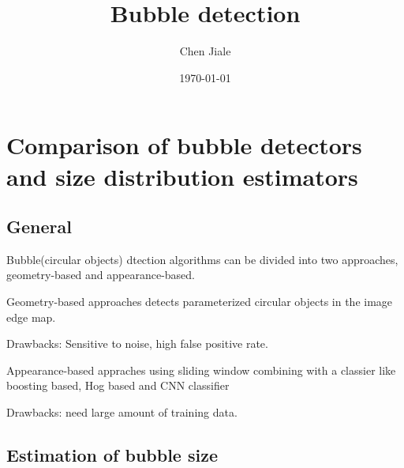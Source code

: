 \documentclass[11pt]{elegantpaper}
\title{Bubble detection}
\author{Chen Jiale}
\date{\today}
\begin{document}
\maketitle

\begin{abstract}

\end{abstract}

\setlength{\parindent}{2em}
\section{Comparison of bubble detectors and size distribution estimators}
\subsection*{General}    
Bubble(circular objects) dtection algorithms can be divided into two approaches, geometry-based and appearance-based.

Geometry-based approaches detects parameterized circular objects in the image edge map.

Drawbacks: Sensitive to noise, high false positive rate. 

Appearance-based appraches using sliding window combining with a classier like boosting based, 
Hog based and CNN classifier

Drawbacks: need large amount of training data.

\subsection*{Estimation of bubble size}
\end{document}
